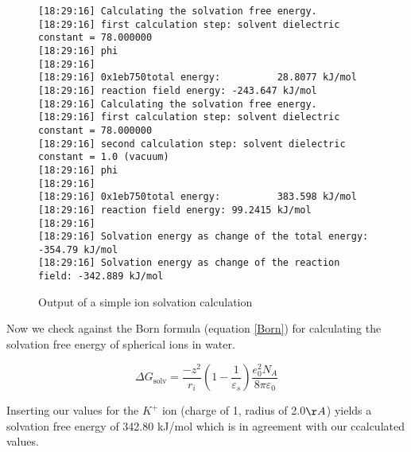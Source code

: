 \documentclass[12pt,twoside,a4paper]{article}
\begin{document}
\begin{figure}
\scriptsize
\begin{verbatim}
[18:29:16] Calculating the solvation free energy.
[18:29:16] first calculation step: solvent dielectric constant = 78.000000
[18:29:16] phi
[18:29:16] 
[18:29:16] 0x1eb750total energy:          28.8077 kJ/mol
[18:29:16] reaction field energy: -243.647 kJ/mol
[18:29:16] Calculating the solvation free energy.
[18:29:16] first calculation step: solvent dielectric constant = 78.000000
[18:29:16] second calculation step: solvent dielectric constant = 1.0 (vacuum)
[18:29:16] phi
[18:29:16] 
[18:29:16] 0x1eb750total energy:          383.598 kJ/mol
[18:29:16] reaction field energy: 99.2415 kJ/mol
[18:29:16] 
[18:29:16] Solvation energy as change of the total energy:   -354.79 kJ/mol
[18:29:16] Solvation energy as change of the reaction field: -342.889 kJ/mol
\end{verbatim}
\normalsize
\caption{Output of a simple ion solvation calculation}
\label{outputK}
\end{figure}

Now we check against the Born\cite{Born1920} formula (equation \ref{Born}) for
calculating the solvation free energy of spherical ions in water.

\begin{equation}
\Delta G_{\mathrm{solv}} = \frac{-z^2}{r_i} \left(1 - \frac{1}{\varepsilon_s}\right) \frac{e_0^2 N_A}{8 \pi \varepsilon_0}
\label{Born}
\end{equation}

Inserting our values for the $K^+$ ion (charge of 1, radius of 2.0$\AA$)
yields a solvation free energy of 342.80 kJ/mol which is in agreement with our ccalculated values.
\end{document}
